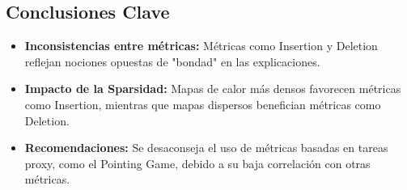 \documentclass{report}
\begin{document}
\subsection{Conclusiones Clave}
\begin{itemize}
    \item \textbf{Inconsistencias entre métricas:} Métricas como Insertion y Deletion reflejan nociones opuestas de "bondad" en las explicaciones.
    \item \textbf{Impacto de la Sparsidad:} Mapas de calor más densos favorecen métricas como Insertion, mientras que mapas dispersos benefician métricas como Deletion.
    \item \textbf{Recomendaciones:} Se desaconseja el uso de métricas basadas en tareas proxy, como el Pointing Game, debido a su baja correlación con otras métricas.
\end{itemize}
\end{document}
